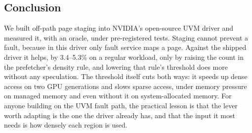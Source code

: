 \subsection{Conclusion}

We built off-path page staging into NVIDIA's open-source UVM driver and
measured it, with an oracle, under pre-registered tests. Staging cannot prevent
a fault, because in this driver only fault service maps a page. Against the
shipped driver it helps, by 3.4--5.3\% on a regular workload, only by raising
the count in the prefetcher's density rule, and lowering that rule's threshold
does more without any speculation. The threshold itself cuts both ways: it
speeds up dense access on two GPU generations and slows sparse access, under
memory pressure on managed memory and even without it on system-allocated
memory. For anyone building on the UVM fault path, the practical lesson is that
the lever worth adapting is the one the driver already has, and that the input
it most needs is how densely each region is used.

